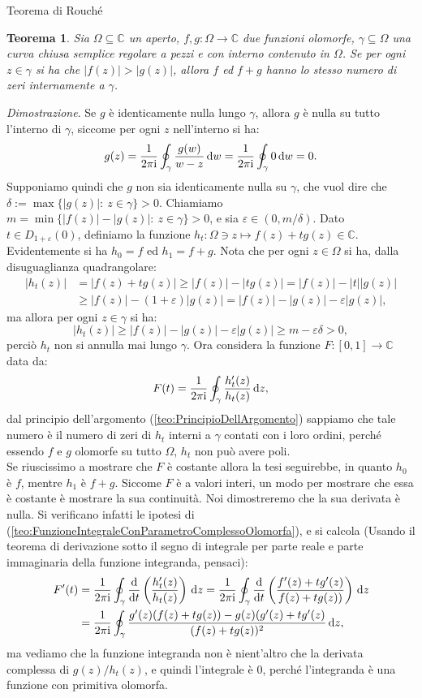 \documentclass[11pt]{book}
\makeatletter
\theoremstyle{Definizione}
\theoremstyle{TeoremaProposizioneLemmaCorollarioCongettura}
\newtheorem{myteo}{Teorema}[section]
\theoremstyle{OsservazioneNotaEsempio}
\renewenvironment{proof}[1][\proofname]{\par
  \normalfont \topsep6\p@\@plus6\p@\relax
  \trivlist
  \item[\hskip\labelsep
        \itshape
    #1\@addpunct{.}]\ignorespaces
}{%
  \endtrivlist\@endpefalse
}
\renewenvironment{proof}{\textsl{Dimostrazione}.}{}
\newcommand{\C}{\mathbb{C}}
\newcommand{\Disc}[3][]{D^{#1}_{{#2}}({#3})}
\renewcommand{\i}{\textup{i}}
\renewcommand{\d}{\mathrm{d}}
\newcommand{\dz}{\,\d z}
\newcommand{\dw}{\,\d w}
\makeatother
\begin{document}
\begin{boxteo}{Teorema di Rouché}
\begin{myteo}\label{teo:TeoremaDiRouché}
Sia $\Omega\subseteq \C$ un aperto, $f,g:\Omega\longrightarrow \C$ due funzioni olomorfe, $\gamma \subseteq \Omega$ una curva chiusa semplice regolare a pezzi e con interno contenuto in $\Omega$. Se per ogni $z\in \gamma$ si ha che $|f(z)| > |g(z)|$, allora $f$ ed $f+g$ hanno lo stesso numero di zeri internamente a $\gamma$.
\end{myteo}
\tcblower
\begin{proof}
Se $g$ è identicamente nulla lungo $\gamma$, allora $g$ è nulla su tutto l'interno di $\gamma$, siccome per ogni $z$ nell'interno si ha:
$$
g(z) = \frac{1}{2\pi\i}\oint_\gamma \frac{g(w)}{w-z}\dw = \frac{1}{2\pi\i}\oint_\gamma 0 \dw = 0.
$$
Supponiamo quindi che $g$ non sia identicamente nulla su $\gamma$, che vuol dire che $\delta:= \max\{|g(z)|:\ z\in \gamma\}>0$. Chiamiamo $m = \min\{|f(z)|-|g(z)|:\ z\in \gamma\} > 0$, e sia $\varepsilon\in (0,m/\delta)$. Dato $t\in \Disc{1+\varepsilon}{0}$, definiamo la funzione $h_t:\Omega\ni z \longmapsto f(z)+tg(z)\in \C$. Evidentemente si ha $h_0 = f$ ed $h_1 =f+g$. Nota che per ogni $z\in \Omega$ si ha, dalla disuguaglianza quadrangolare:
\begin{align*}
|h_t(z)| &= |f(z)+tg(z)| \geq |f(z)|-|tg(z)| = |f(z)|-|t||g(z)| \\
&\geq |f(z)|-(1+\varepsilon)|g(z)| = |f(z)|-|g(z)|-\varepsilon|g(z)|,
\end{align*}
ma allora per ogni $z\in \gamma$ si ha:
$$
|h_t(z)| \geq |f(z)|-|g(z)| - \varepsilon|g(z)| \geq m -\varepsilon \delta > 0,
$$
perciò $h_t$ non si annulla mai lungo $\gamma$. Ora considera la funzione $F:[0,1]\longrightarrow \C$ data da:
$$
F(t) = \frac{1}{2\pi\i}\oint_\gamma \frac{h_t'(z)}{h_t(z)}\dz,
$$
dal principio dell'argomento (\ref{teo:PrincipioDellArgomento}) sappiamo che tale numero è il numero di zeri di $h_t$ interni a $\gamma$ contati con i loro ordini, perché essendo $f$ e $g$ olomorfe su tutto $\Omega$, $h_t$ non può avere poli.\\
Se riuscissimo a mostrare che $F$ è costante allora la tesi seguirebbe, in quanto $h_0$ è $f$, mentre $h_1$ è $f+g$. Siccome $F$ è a valori interi, un modo per mostrare che essa è costante è mostrare la sua continuità. Noi dimostreremo che la sua derivata è nulla. Si verificano infatti le ipotesi di (\ref{teo:FunzioneIntegraleConParametroComplessoOlomorfa}), e si calcola (Usando il teorema di derivazione sotto il segno di integrale per parte reale e parte immaginaria della funzione integranda, pensaci):
\begin{align*}
F'(t) &= \frac{1}{2\pi\i}\oint_\gamma \frac{\d}{\d t} \left(\frac{h_t'(z)}{h_t(z)}\right)\dz = \frac{1}{2\pi\i}\oint_\gamma \frac{\d}{\d t}\left(\frac{f'(z)+tg'(z)}{f(z)+tg(z))}\right)\dz\\
&= \frac{1}{2\pi\i}\oint_\gamma \frac{g'(z)(f(z)+tg(z))-g(z)(g'(z)+tg'(z)}{(f(z)+tg(z))^2}\dz,
\end{align*}
ma vediamo che la funzione integranda non è nient'altro che la derivata complessa di $g(z)/h_t(z)$, e quindi l'integrale è $0$, perché l'integranda è una funzione con primitiva olomorfa.
\end{proof}
\end{boxteo}
\end{document}
